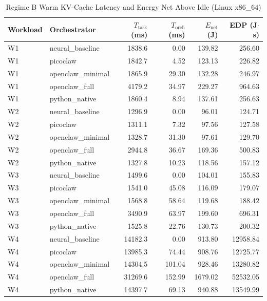\begin{table}[t]
\centering\small
\caption{Regime B Warm KV-Cache Latency and Energy Net Above Idle (Linux x86_64)}
\label{tab:linux_warm_cache}
\begin{tabular}{llrrrr}
\toprule
Workload & Orchestrator & $T_{\text{task}}$ (ms) & $T_{\text{orch}}$ (ms) & $E_{\text{net}}$ (J) & EDP (J$\cdot$s) \\
\midrule
W1 & neural\_baseline & 1838.6 & 0.00 & 139.82 & 256.60 \\
W1 & picoclaw & 1842.7 & 4.52 & 123.13 & 226.82 \\
W1 & openclaw\_minimal & 1865.9 & 29.30 & 132.28 & 246.97 \\
W1 & openclaw\_full & 4179.2 & 34.97 & 229.27 & 964.63 \\
W1 & python\_native & 1860.4 & 8.94 & 137.61 & 256.63 \\
W2 & neural\_baseline & 1296.9 & 0.00 & 96.01 & 124.71 \\
W2 & picoclaw & 1311.1 & 7.32 & 97.56 & 127.58 \\
W2 & openclaw\_minimal & 1328.7 & 31.30 & 97.61 & 129.70 \\
W2 & openclaw\_full & 2944.8 & 36.67 & 169.36 & 500.83 \\
W2 & python\_native & 1327.8 & 10.23 & 118.56 & 157.12 \\
W3 & neural\_baseline & 1499.6 & 0.00 & 104.01 & 155.83 \\
W3 & picoclaw & 1541.0 & 45.08 & 116.09 & 179.07 \\
W3 & openclaw\_minimal & 1568.8 & 58.64 & 119.68 & 188.42 \\
W3 & openclaw\_full & 3490.9 & 63.97 & 199.60 & 696.31 \\
W3 & python\_native & 1525.8 & 22.76 & 130.73 & 200.32 \\
W4 & neural\_baseline & 14182.3 & 0.00 & 913.80 & 12958.84 \\
W4 & picoclaw & 13985.3 & 74.44 & 908.76 & 12725.77 \\
W4 & openclaw\_minimal & 14304.5 & 101.04 & 928.46 & 13280.82 \\
W4 & openclaw\_full & 31269.6 & 152.99 & 1679.02 & 52532.05 \\
W4 & python\_native & 14397.7 & 69.13 & 940.88 & 13549.99 \\
\bottomrule
\end{tabular}
\end{table}
